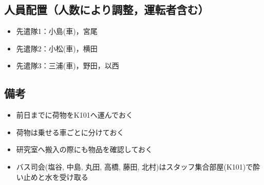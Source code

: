 \subsection{人員配置（人数により調整，運転者含む）}
\begin{itemize}
\item 先遣隊1：小島(車)，宮尾
\item 先遣隊2：小松(車)，横田
\item 先遣隊3：三浦(車)，野田，以西

\end{itemize}

\subsection{備考}
\begin{itemize}
\item 前日までに荷物をK101へ運んでおく
\item 荷物は乗せる車ごとに分けておく
\item 研究室へ搬入の際にも物品を確認しておく
\item バス司会(塩谷, 中島, 丸田, 高橋, 藤田, 北村)はスタッフ集合部屋(K101)で酔い止めと水を受け取る
\end{itemize}


%
